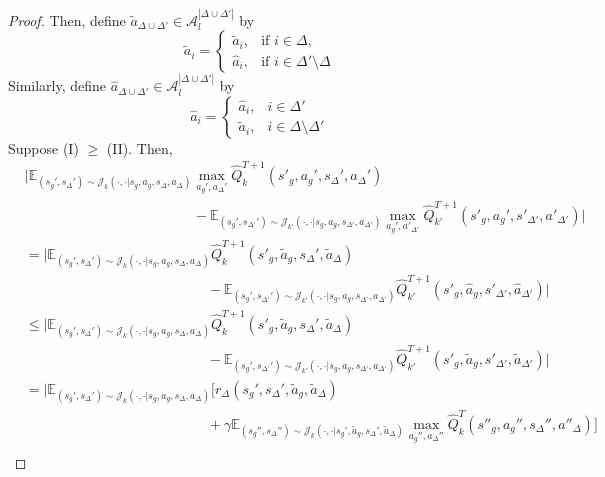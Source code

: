 \documentclass{article}
\theoremstyle{plain}
\theoremstyle{definition}
\def\E{\mathbb{E}}
\begin{document}
\begin{proof}
Then, define $\tilde{a}_{\Delta\cup\Delta'} \in \mathcal{A}_l^{|\Delta\cup\Delta'|}$ by 
\[\tilde{a}_i = \begin{cases}\tilde{a}_i,& \text{if $i\in\Delta$},\\ \hat{a}_i,& \text{if $i\in\Delta'\setminus\Delta$}\end{cases}\] 
Similarly, define $\hat{a}_{\Delta\cup\Delta'}\in\mathcal{A}_l^{|\Delta\cup\Delta'|}$ by
\[\hat{a}_i = \begin{cases}\hat{a}_i, & i\in\Delta'\\ \tilde{a}_i, & i\in\Delta\setminus\Delta' \end{cases}\]
Suppose (I) $\geq$ (II). Then, 
\begin{align*}
&\bigg|\E_{(s_g',s_\Delta')\sim{\mathcal{J}_k(\cdot,\cdot|s_g,a_g,s_\Delta,a_\Delta)}} \max_{a_g',a_\Delta'}\hat{Q}_k^{T+1}(s'_g,a_g',s_\Delta',a_\Delta') \\
&\quad\quad\quad\quad\quad\quad\quad\quad\quad\quad\quad\quad -\E_{(s_g',s_{\Delta'}')\sim{\mathcal{J}_{k'}(\cdot,\cdot|s_g,a_g,s_{\Delta'},a_{\Delta'})}}\max_{a_g',a'_{\Delta'}}\hat{Q}_{k'}^{T+1}(s'_g, a_g',s'_{\Delta'}, a'_{\Delta'})\bigg| 
\end{align*}\begin{align*}
&= \bigg|\E_{(s_g',s_\Delta')\sim{\mathcal{J}_k(\cdot,\cdot|s_g,a_g,s_\Delta,a_\Delta)}} \hat{Q}_k^{T+1}(s'_g,\tilde{a}_g,s_\Delta',\tilde{a}_\Delta) \\ &\quad\quad\quad\quad\quad\quad\quad\quad\quad\quad\quad\quad\quad-\E_{(s_g',s_{\Delta'}')\sim{\mathcal{J}_{k'}(\cdot,\cdot|s_g,a_g,s_{\Delta'},a_{\Delta'})}}\hat{Q}_{k'}^{T+1}(s'_g, \hat{a}_g,s'_{\Delta'}, \hat{a}_{\Delta'})\bigg|\\
&\leq \bigg|\E_{(s_g',s_\Delta')\sim{\mathcal{J}_k(\cdot,\cdot|s_g,a_g,s_\Delta,a_\Delta)}} \hat{Q}_k^{T+1}(s'_g,\tilde{a}_g,s_\Delta',\tilde{a}_\Delta) \\
&\quad\quad\quad\quad\quad\quad\quad\quad\quad\quad\quad\quad\quad-\E_{(s_g',s_{\Delta'}')\sim{\mathcal{J}_{k'}(\cdot,\cdot|s_g,a_g,s_{\Delta'},a_{\Delta'})}}\hat{Q}_{k'}^{T+1}(s'_g, \tilde{a}_g,s'_{\Delta'}, \tilde{a}_{\Delta'})\bigg| \\
&=\bigg|\E_{(s_g',s_\Delta')\sim{\mathcal{J}_k(\cdot,\cdot|s_g,a_g,s_\Delta,a_\Delta)}} \bigg[r_\Delta(s_g',s_\Delta',\tilde{a}_g,\tilde{a}_\Delta)\\
&\quad\quad\quad\quad\quad\quad\quad\quad\quad\quad\quad\quad\quad+\gamma\E_{(s_g'',s_\Delta'')\sim\mathcal{J}_k(\cdot,\cdot|s_g',\tilde{a}_g,s_\Delta',\tilde{a}_\Delta)}\max_{a_g'',a_\Delta''}\hat{Q}_k^{T}(s''_g,a_g'',s_\Delta'',{a}''_\Delta)\bigg]\\

\end{align*}
\end{proof}
\end{document}
